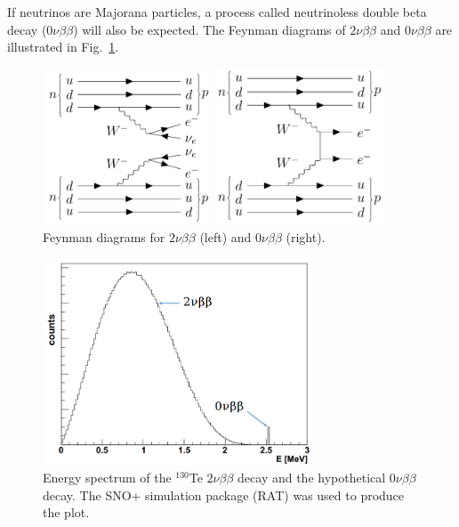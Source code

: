 If neutrinos are Majorana particles, a process called neutrinoless double beta decay ($0\nu\beta\beta$) will also be expected. The Feynman diagrams of $2\nu\beta\beta$ and $0\nu\beta\beta$ are illustrated in Fig.~\ref{feynman1}.

\begin{figure}[htbp]
	\centering	
	\begin{minipage}[t]{0.45\textwidth}
		\includegraphics[width=5cm]{doubleBeta2nu_feynman.png}
	\end{minipage}
	\begin{minipage}[t]{0.45\textwidth}
		\includegraphics[width=5cm]{doubleBeta_feynman.png}
	\end{minipage}
	\caption{ Feynman diagrams for $2\nu\beta\beta$ (left) and $0\nu\beta\beta$ (right).}
	\label{feynman1}
\end{figure}

\begin{figure}[htbp]
	\centering	
	\includegraphics[width=8cm]{Te130_energy0vbb.png}
	\caption{Energy spectrum of the $^{130}$Te $2\nu\beta\beta$ decay and the hypothetical $0\nu\beta\beta$ decay. The SNO+ simulation package (RAT) was used to produce the plot.}
	\label{te130energy}
\end{figure}

